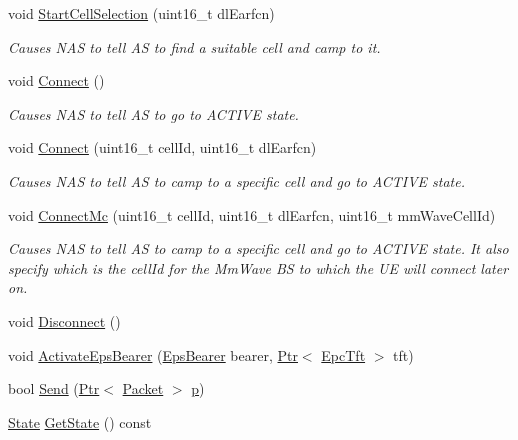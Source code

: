 \begin{DoxyCompactItemize}
\item 
void \hyperlink{classns3_1_1EpcUeNas_aeb54c68bd635fe65b1ec3c49b204922e}{Start\+Cell\+Selection} (uint16\+\_\+t dl\+Earfcn)
\begin{DoxyCompactList}\small\item\em Causes N\+AS to tell AS to find a suitable cell and camp to it. \end{DoxyCompactList}\item 
void \hyperlink{classns3_1_1EpcUeNas_ab2aed3f62fb8b29dbdad92c58c3571c2}{Connect} ()
\begin{DoxyCompactList}\small\item\em Causes N\+AS to tell AS to go to A\+C\+T\+I\+VE state. \end{DoxyCompactList}\item 
void \hyperlink{classns3_1_1EpcUeNas_a23951c5ee06b3ccb00095d5c8f3da700}{Connect} (uint16\+\_\+t cell\+Id, uint16\+\_\+t dl\+Earfcn)
\begin{DoxyCompactList}\small\item\em Causes N\+AS to tell AS to camp to a specific cell and go to A\+C\+T\+I\+VE state. \end{DoxyCompactList}\item 
void \hyperlink{classns3_1_1EpcUeNas_a3cca4ca35d52ac612e8b080e415e9649}{Connect\+Mc} (uint16\+\_\+t cell\+Id, uint16\+\_\+t dl\+Earfcn, uint16\+\_\+t mm\+Wave\+Cell\+Id)
\begin{DoxyCompactList}\small\item\em Causes N\+AS to tell AS to camp to a specific cell and go to A\+C\+T\+I\+VE state. It also specify which is the cell\+Id for the Mm\+Wave BS to which the UE will connect later on. \end{DoxyCompactList}\item 
void \hyperlink{classns3_1_1EpcUeNas_aa3409bff18e25d34b75dece3dc201863}{Disconnect} ()
\item 
void \hyperlink{classns3_1_1EpcUeNas_acf5ffebf27befd60a0984e8284556b92}{Activate\+Eps\+Bearer} (\hyperlink{structns3_1_1EpsBearer}{Eps\+Bearer} bearer, \hyperlink{classns3_1_1Ptr}{Ptr}$<$ \hyperlink{classns3_1_1EpcTft}{Epc\+Tft} $>$ tft)
\item 
bool \hyperlink{classns3_1_1EpcUeNas_a486e2eae585304c4b4cba67cabcecb53}{Send} (\hyperlink{classns3_1_1Ptr}{Ptr}$<$ \hyperlink{classns3_1_1Packet}{Packet} $>$ \hyperlink{lte__link__budget__x2__handover__measures_8m_ac9de518908a968428863f829398a4e62}{p})
\item 
\hyperlink{classns3_1_1EpcUeNas_a8047255fecfac11c9e1abe6f13d527dc}{State} \hyperlink{classns3_1_1EpcUeNas_a525f02c6dcc5aa76716374a582b640d6}{Get\+State} () const 
\end{DoxyCompactItemize}
